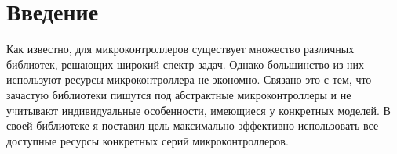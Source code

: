 \section{Введение}
Как известно, для микроконтроллеров существует множество различных библиотек, решающих широкий спектр задач. Однако большинство из них используют ресурсы микроконтроллера не экономно. Связано это с тем, что зачастую библиотеки пишутся под абстрактные микроконтроллеры и не учитывают индивидуальные  особенности, имеющиеся у конкретных моделей. В своей библиотеке я поставил цель максимально эффективно использовать все доступные ресурсы конкретных серий микроконтроллеров.
